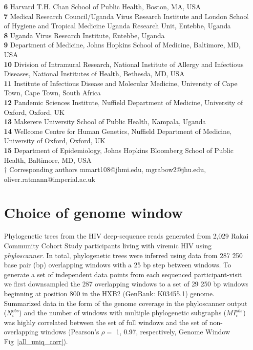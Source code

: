 \documentclass[10pt,letterpaper]{article}
\begin{document}
\begin{flushleft}
\textbf{6} Harvard T.H. Chan School of Public Health, Boston, MA, USA \\

\textbf{7} Medical Research Council/Uganda Virus Research Institute and London School of Hygiene and Tropical Medicine Uganda Research Unit, Entebbe, Uganda \\

\textbf{8} Uganda Virus Research Institute, Entebbe, Uganda \\

\textbf{9} Department of Medicine, Johns Hopkins School of Medicine, Baltimore, MD, USA
\\
\textbf{10} Division of Intramural Research, National Institute of Allergy and Infectious Diseases, National Institutes of Health, Bethesda, MD, USA
\\
\textbf{11} Institute of Infectious Disease and Molecular Medicine, University of Cape Town, Cape Town, South Africa
\\
\textbf{12} Pandemic Sciences Institute, Nuffield Department of Medicine, University of Oxford, Oxford, UK \\

\textbf{13} Makerere University School of Public Health, Kampala, Uganda \\

\textbf{14} Wellcome Centre for Human Genetics, Nuffield Department of Medicine, University of Oxford, Oxford, UK \\

\textbf{15} Department of Epidemiology, Johns Hopkins Bloomberg School of Public Health, Baltimore, MD, USA \\

\bigskip
$\dagger$ Corresponding authors mmart108@jhmi.edu, mgrabow2@jhu.edu, oliver.ratmann@imperial.ac.uk 
\end{flushleft}

\section{Choice of genome window}
Phylogenetic trees from the HIV deep-sequence reads generated from 2,029 Rakai Community Cohort Study participants living with viremic HIV using \textit{phyloscanner}. In total, phylogenetic trees were inferred using data from 287 250 base pair (bp) overlapping windows with a 25 bp step between windows. To generate a set of independent data points from each sequenced participant-visit we first downsampled the 287 overlapping windows to a set of 29 250 bp windows beginning at position 800 in the HXB2 (GenBank: K03455.1) genome.  Summarized data in the form of the genome coverage in the phyloscanner output ($N^{obs}_i$) and the number of windows with multiple phylogenetic subgraphs ($MI^{obs}_i$) was highly correlated between the set of full windows and the set of non-overlapping windows (Pearson's $\rho=$ 1, 0.97, respectively, Genome Window Fig~\ref{all_uniq_corr}).
\end{document}
